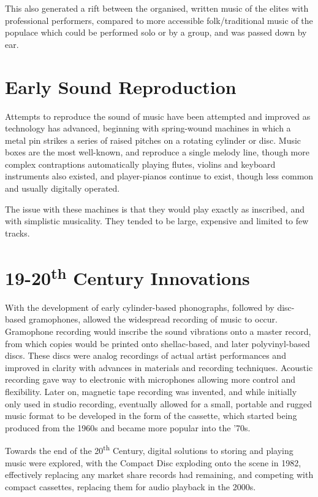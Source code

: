 \documentclass[a4paper, 12pt]{report}
\begin{document}
This also generated a rift between the 
organised, written music of the elites with professional performers,
compared to more accessible folk/traditional music of the populace which could be performed solo or by a group, and was passed down by ear.

\section{Early Sound Reproduction}
Attempts to reproduce the sound of music have been attempted and improved as technology has advanced,
beginning with spring-wound machines in which a metal pin strikes a series of raised pitches on a rotating cylinder or disc.
Music boxes are the most well-known, and reproduce a single melody line, though more complex contraptions automatically playing flutes,
violins and keyboard instruments also existed, and player-pianos continue to exist, though less common and usually digitally operated.

The issue with these machines is that they would play exactly as inscribed, and with simplistic musicality. They tended to be large, expensive and limited to few tracks.

\section{19-20\textsuperscript{th} Century Innovations}
With the development of early cylinder-based phonographs, followed by disc-based gramophones, allowed the widespread recording of music to occur.
Gramophone recording would inscribe the sound vibrations onto a master record, from which copies would be printed onto shellac-based, and later polyvinyl-based
discs. These discs were analog recordings of actual artist performances and improved in clarity with advances in materials and recording techniques.
Acoustic recording gave way to electronic with microphones allowing more control and flexibility.
Later on, magnetic tape recording was invented, and while initially only used in studio recording,
eventually allowed for a small, portable and rugged music format to be developed in the form of the cassette,
which started being produced from the 1960s and became more popular into the '70s.

Towards the end of the 20\textsuperscript{th} Century, digital solutions to storing and playing music were explored, with the Compact Disc exploding onto the scene in 1982,
effectively replacing any market share records had remaining, and competing with compact cassettes, replacing them for audio playback in the 2000s.
\end{document}

